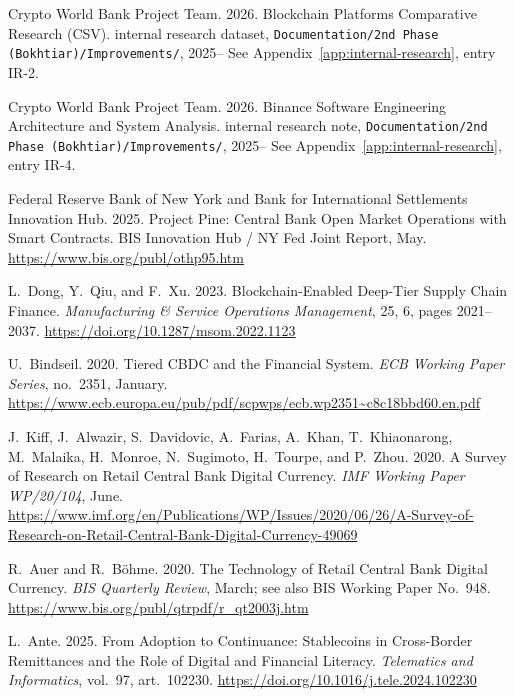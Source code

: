 \documentclass[12pt, a4paper]{report}
\begin{document}
{\begin{enumerate}[label={[\arabic*]}]
\item Crypto World Bank Project Team. 2026. Blockchain Platforms Comparative Research (CSV). internal research dataset, \texttt{Documentation/2nd Phase (Bokhtiar)/Improvements/}, 2025-- See Appendix~\ref{app:internal-research}, entry IR-2.

\item Crypto World Bank Project Team. 2026. Binance Software Engineering Architecture and System Analysis. internal research note, \texttt{Documentation/2nd Phase (Bokhtiar)/Improvements/}, 2025-- See Appendix~\ref{app:internal-research}, entry IR-4.

\item Federal Reserve Bank of New York and Bank for International Settlements Innovation Hub. 2025. Project Pine: Central Bank Open Market Operations with Smart Contracts. BIS Innovation Hub / NY Fed Joint Report, May. \url{https://www.bis.org/publ/othp95.htm}

\item L.~Dong, Y.~Qiu, and F.~Xu. 2023. Blockchain-Enabled Deep-Tier Supply Chain Finance. \emph{Manufacturing \& Service Operations Management}, 25, 6, pages 2021--2037. \url{https://doi.org/10.1287/msom.2022.1123}

\item U.~Bindseil. 2020. Tiered CBDC and the Financial System. \emph{ECB Working Paper Series}, no.~2351, January. \url{https://www.ecb.europa.eu/pub/pdf/scpwps/ecb.wp2351~c8c18bbd60.en.pdf}

\item J.~Kiff, J.~Alwazir, S.~Davidovic, A.~Farias, A.~Khan, T.~Khiaonarong, M.~Malaika, H.~Monroe, N.~Sugimoto, H.~Tourpe, and P.~Zhou. 2020. A Survey of Research on Retail Central Bank Digital Currency. \emph{IMF Working Paper WP/20/104}, June. \url{https://www.imf.org/en/Publications/WP/Issues/2020/06/26/A-Survey-of-Research-on-Retail-Central-Bank-Digital-Currency-49069}

\item R.~Auer and R.~B\"{o}hme. 2020. The Technology of Retail Central Bank Digital Currency. \emph{BIS Quarterly Review}, March; see also BIS Working Paper No.~948. \url{https://www.bis.org/publ/qtrpdf/r_qt2003j.htm}

\item L.~Ante. 2025. From Adoption to Continuance: Stablecoins in Cross-Border Remittances and the Role of Digital and Financial Literacy. \emph{Telematics and Informatics}, vol.~97, art.~102230. \url{https://doi.org/10.1016/j.tele.2024.102230}


\end{enumerate}}
\end{document}

